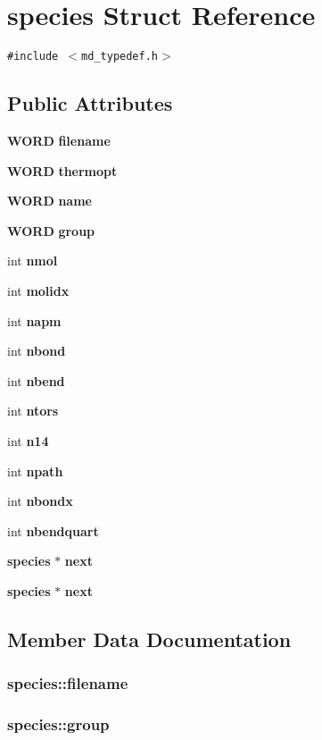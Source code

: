 \section{species Struct Reference}
\label{structspecies}
{\tt \#include $<$md\_\-typedef.h$>$}

\subsection*{Public Attributes}
\begin{CompactItemize}
\item 
{\bf WORD} {\bf filename}
\item 
{\bf WORD} {\bf thermopt}
\item 
{\bf WORD} {\bf name}
\item 
{\bf WORD} {\bf group}
\item 
int {\bf nmol}
\item 
int {\bf molidx}
\item 
int {\bf napm}
\item 
int {\bf nbond}
\item 
int {\bf nbend}
\item 
int {\bf ntors}
\item 
int {\bf n14}
\item 
int {\bf npath}
\item 
int {\bf nbondx}
\item 
int {\bf nbendquart}
\item 
{\bf species} $\ast$ {\bf next}
\item 
{\bf species} $\ast$ {\bf next}
\end{CompactItemize}


\subsection{Member Data Documentation}
\subsubsection{ {\bf species::filename}}\label{structspecies_57e00d21180f370356c97ce4e14df390}


\subsubsection{ {\bf species::group}}\label{structspecies_9f6ec2a788af458e084d5bb1341f71c8}


